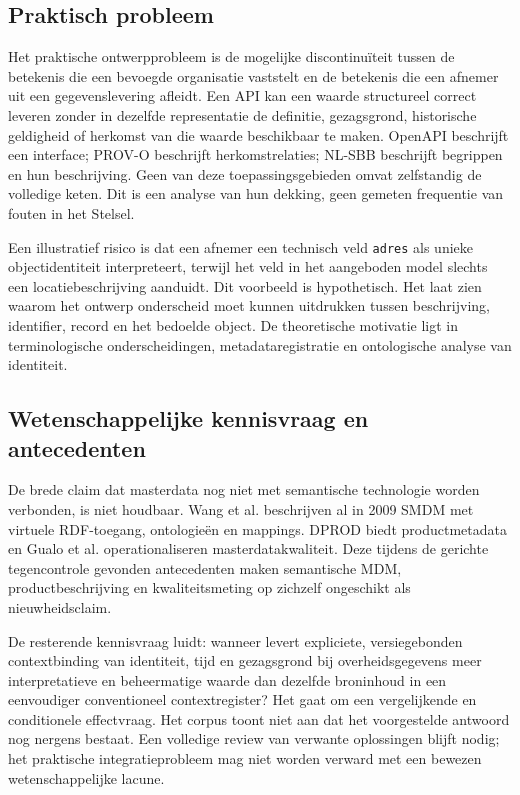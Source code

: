 \subsection{Praktisch probleem}
Het praktische ontwerpprobleem is de mogelijke discontinuïteit tussen de betekenis die een bevoegde organisatie vaststelt en de betekenis die een afnemer uit een gegevenslevering afleidt. Een API kan een waarde structureel correct leveren zonder in dezelfde representatie de definitie, gezagsgrond, historische geldigheid of herkomst van die waarde beschikbaar te maken. OpenAPI beschrijft een interface; PROV-O beschrijft herkomstrelaties; NL-SBB beschrijft begrippen en hun beschrijving. Geen van deze toepassingsgebieden omvat zelfstandig de volledige keten. \citep{S19,S33,S14} Dit is een analyse van hun dekking, geen gemeten frequentie van fouten in het Stelsel.

Een illustratief risico is dat een afnemer een technisch veld \texttt{adres} als unieke objectidentiteit interpreteert, terwijl het veld in het aangeboden model slechts een locatiebeschrijving aanduidt. Dit voorbeeld is hypothetisch. Het laat zien waarom het ontwerp onderscheid moet kunnen uitdrukken tussen beschrijving, identifier, record en het bedoelde object. De theoretische motivatie ligt in terminologische onderscheidingen, metadata\-registratie en ontologische analyse van identiteit. \citep{S11,S08,L08,L10}

\subsection{Wetenschappelijke kennisvraag en antecedenten}
De brede claim dat masterdata nog niet met semantische technologie worden verbonden, is niet houdbaar. Wang et al. beschrijven al in 2009 SMDM met virtuele RDF-toegang, ontologieën en mappings. \citep{L18} DPROD biedt productmetadata en Gualo et al. operationaliseren masterdatakwaliteit. \citep{S51,L19} Deze tijdens de gerichte tegencontrole gevonden antecedenten maken semantische MDM, productbeschrijving en kwaliteitsmeting op zichzelf ongeschikt als nieuwheidsclaim.

De resterende kennisvraag luidt: wanneer levert expliciete, versiegebonden contextbinding van identiteit, tijd en gezagsgrond bij overheidsgegevens meer interpretatieve en beheermatige waarde dan dezelfde broninhoud in een eenvoudiger conventioneel contextregister? Het gaat om een vergelijkende en conditionele effectvraag. Het corpus toont niet aan dat het voorgestelde antwoord nog nergens bestaat. Een volledige review van verwante oplossingen blijft nodig; het praktische integratieprobleem mag niet worden verward met een bewezen wetenschappelijke lacune.

